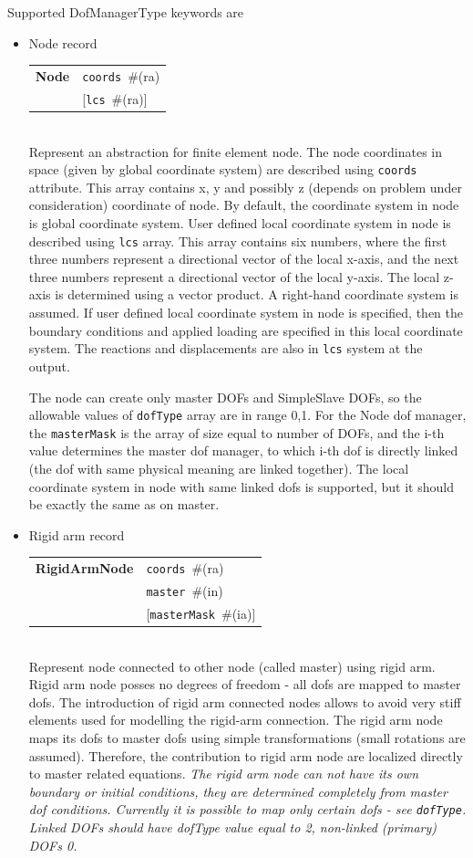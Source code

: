 \documentclass[a4paper]{article}
\makeatletter
\newcommand{\param}[1]{\texttt{#1}} %
\newcommand{\optional}[1]{[#1]} %
\newcommand{\field}[2]{\param{#1}~\#{\tiny(#2)}} %
\newcommand{\optField}[2]{\optional{\field{#1}{#2}}}
\newcommand{\entKeywordInst}[1]{\textbf{#1}} %
\newenvironment{record}[1][]{\begin{tabular}{|ll}}{\end{tabular}\\}
\newcommand{\recentry}[2]{{#1}&{#2}\\}
\newcounter{rcc}
\newenvironment{record}[1][\textwidth]{\setcounter{rcc}{0}\begin{tabular*}{#1}{|ll@{\extracolsep{\fill}}r}}{\end{tabular*}\\}
\newcommand{\recentry}[2]{\ifthenelse{\value{rcc}>0}{&$\backslash$ \\}{\setcounter{rcc}{1}}{#1}&{#2}}
\makeatother
\begin{document}
Supported DofManagerType keywords are
\begin{itemize}
\item Node record

\begin{record}[0.9\textwidth]
  \recentry{\entKeywordInst{Node}}{\field{coords}{ra}}
  \recentry{}{[\field{lcs}{ra}]}
\end{record}
Represent an abstraction for finite element node.
The node coordinates in space (given by global coordinate system) are described
using \param{coords} attribute. This array contains x, y and possibly z
(depends on problem under consideration) coordinate of node.
By default, the coordinate system in node is global coordinate system.
User defined local coordinate system in node is described using \param{lcs} array. This
array contains six numbers, where the first three numbers represent
a directional vector of the local x-axis, and the next three numbers represent
a directional vector of the local y-axis. The local z-axis is determined
using a vector product. A right-hand coordinate system is assumed.
If user defined local coordinate system in node is specified, then the
boundary conditions and applied loading are specified in this local coordinate system.
The reactions and displacements are also in \param{lcs} system at the output.

The node can create only master DOFs and SimpleSlave DOFs, so the
allowable values of \param{dofType} array are in range {0,1}.
For the Node dof manager, the \param{masterMask} is the array of size
equal to number of DOFs, and the i-th value determines the
master dof manager, to which i-th dof is directly linked (the dof with
same physical meaning are linked together).
The local coordinate
system in node with same linked dofs is supported, but it should be exactly the
same as on master.


\item Rigid arm record

\begin{record}[0.9\textwidth]
  \recentry{\entKeywordInst{RigidArmNode}}{\field{coords}{ra}}
  \recentry{}{\field{master}{in}}
  \recentry{}{\optField{masterMask}{ia}}
\end{record}
Represent node connected to other node (called master) using rigid
arm. Rigid arm node posses no degrees of freedom - all dofs are mapped to master
dofs. The introduction of rigid arm connected nodes allows to avoid very
stiff elements used for modelling the rigid-arm connection.
The rigid arm node maps its dofs to master dofs using simple transformations
(small rotations are assumed). Therefore, the contribution to rigid
arm node are localized directly to master related equations.
{\em The rigid arm node can not have its own boundary or initial conditions, they are
determined completely from master dof conditions. Currently it is
possible to map only certain dofs - see \param{dofType}. Linked DOFs
should have dofType value equal to 2, non-linked (primary) DOFs 0.}


\end{itemize}
\end{document}
